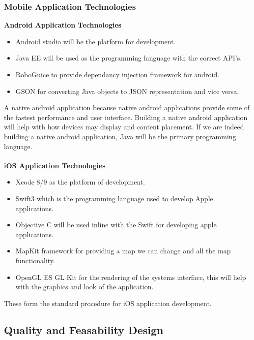 \documentclass[a4paper,12pt]{report}
\begin{document}
\subsubsection{Mobile Application Technologies}
\textbf{Android Application Technologies}
\begin{itemize}
	\item Android studio will be the platform for development.
	\item Java EE will be used as the programming language with the correct API's.
	\item RoboGuice to provide dependancy injection framework for android.
	\item GSON for converting Java objects to JSON representation and vice versa.
\end{itemize}
A native android application because native android applications provide some of the fastest performance and user interface. Building a native android application will help with how devices may display and content placement. If we are indeed building a native android application, Java will be the primary programming language.\\\\
\textbf{iOS Application Technologies}
\begin{itemize}
	\item Xcode 8/9 as the platform of development.
	\item Swift3 which is the programming language used to develop Apple applications.
	\item Objective C will be used inline with the Swift for developing apple applications.
	\item MapKit framework for providing a map we can change and all the map functionality.
	\item OpenGL ES GL Kit for the rendering of the systems interface, this will help with the graphics and look of the application.
\end{itemize}
These form the standard procedure for iOS application development.
\newpage
\subsection{Quality and Feasability Design}
\end{document}
